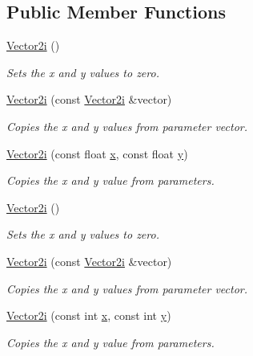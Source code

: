 \subsection*{Public Member Functions}
\begin{DoxyCompactItemize}
\item 
\mbox{\label{class_vector2i_af7591e3b419896ac998a7ed71efc1905}} 
\mbox{\hyperlink{class_vector2i_af7591e3b419896ac998a7ed71efc1905}{Vector2i}} ()
\begin{DoxyCompactList}\small\item\em Sets the x and y values to zero. \end{DoxyCompactList}\item 
\mbox{\hyperlink{class_vector2i_adbf2fd9e34af2e90dc22339eab2c4524}{Vector2i}} (const \mbox{\hyperlink{class_vector2i}{Vector2i}} \&vector)
\begin{DoxyCompactList}\small\item\em Copies the x and y values from parameter vector. \end{DoxyCompactList}\item 
\mbox{\hyperlink{class_vector2i_ada4ad39dfa092f345d3d5de39134cf8d}{Vector2i}} (const float \mbox{\hyperlink{class_vector2_a78fa1f2ed5e261c7fbeb8f3536a1ee34}{x}}, const float \mbox{\hyperlink{class_vector2_a6cfed8355591aa269f4dba43bd806ef9}{y}})
\begin{DoxyCompactList}\small\item\em Copies the x and y value from parameters. \end{DoxyCompactList}\item 
\mbox{\label{class_vector2i_af7591e3b419896ac998a7ed71efc1905}} 
\mbox{\hyperlink{class_vector2i_af7591e3b419896ac998a7ed71efc1905}{Vector2i}} ()
\begin{DoxyCompactList}\small\item\em Sets the x and y values to zero. \end{DoxyCompactList}\item 
\mbox{\hyperlink{class_vector2i_adbf2fd9e34af2e90dc22339eab2c4524}{Vector2i}} (const \mbox{\hyperlink{class_vector2i}{Vector2i}} \&vector)
\begin{DoxyCompactList}\small\item\em Copies the x and y values from parameter vector. \end{DoxyCompactList}\item 
\mbox{\hyperlink{class_vector2i_ab715344e281f1ea627ed55fe576eda47}{Vector2i}} (const int \mbox{\hyperlink{class_vector2_a78fa1f2ed5e261c7fbeb8f3536a1ee34}{x}}, const int \mbox{\hyperlink{class_vector2_a6cfed8355591aa269f4dba43bd806ef9}{y}})
\begin{DoxyCompactList}\small\item\em Copies the x and y value from parameters. \end{DoxyCompactList}\end{DoxyCompactItemize}
